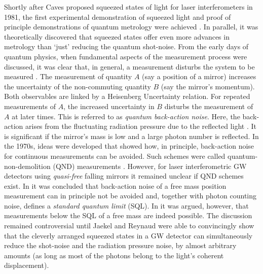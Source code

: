 
Shortly after Caves proposed squeezed states of light for laser
interferometers in 1981, the first experimental demonstration of squeezed
light \cite{Slusher1985} and proof of principle demonstrations of
quantum metrology were achieved \cite{Xiao1987,Grangier1987}. In parallel, it was theoretically discovered that squeezed states offer even more advances in metrology than `just' reducing the quantum shot-noise.
From the early days of quantum physics, when fundamental
aspects of the measurement process were discussed, it was clear that,
in general, a measurement disturbs the system to be measured
\cite{Braginsky1999}. %
 The measurement of quantity $A$ (say
a position of a mirror) increases the uncertainty of the
non-commuting quantity $B$ (say the mirror's momentum). Both
observables are linked by a Heisenberg Uncertainty relation. For
repeated measurements of $A$, the increased uncertainty in $B$
disturbs the measurement of $A$ at later times. This is referred to
as \textit{quantum back-action noise}. Here, the back-action arises
from the fluctuating radiation pressure due to the reflected light \cite{CavesPRL451980}.
It is significant if the mirror's mass is low and a
large photon number is reflected. In the 1970s, ideas were developed
that showed how, in principle, back-action noise for continuous
measurements can be avoided. Such schemes were called
quantum-non-demolition (QND) measurements \cite{Thorne1978, BraginskyRMP1996}.
However, for laser interferometric GW detectors
using \textit{quasi-free} falling mirrors it remained unclear if QND schemes
exist. In \cite{CavesPRL451980,Caves1981} it was concluded that back-action noise
of a free mass position measurement can in principle not be avoided and, together with photon counting noise, defines a \textsl{standard
quantum limit} (SQL). In \cite{Yuen1983,Unruh1983} it was argued, however, that measurements below the
SQL of a free mass are indeed possible. The discussion
remained controversial \cite{CavesPRL1985} until Jaekel and Reynaud
\cite{Jaekel1990} were able to convincingly show that the cleverly
arranged squeezed states in a GW detector can simultaneously reduce
the shot-noise and the radiation pressure noise, by almost arbitrary
amounts (as long as most of the photons belong to the light's coherent displacement).

